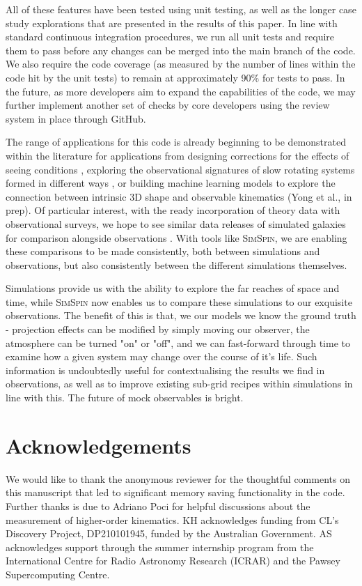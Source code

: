 \documentclass[
  journal=pasa,
  manuscript=research-paper, %
  year=2020,
  volume=37,
]{cup-journal}
\newcommand{\simspin}[1]{\textsc{SimSpin}#1} %
\begin{document}
All of these features have been tested using unit testing, as well as the longer case study explorations that are presented in the results of this paper. 
In line with standard continuous integration procedures, we run all unit tests and require them to pass before any changes can be merged into the main branch of the code. 
We also require the code coverage (as measured by the number of lines within the code hit by the unit tests) to remain at approximately 90\% for tests to pass. 
In the future, as more developers aim to expand the capabilities of the code, we may further implement another set of checks by core developers using the review system in place through GitHub. 

The range of applications for this code is already beginning to be demonstrated within the literature for applications from designing corrections for the effects of seeing conditions \citep{Harborne2020RecoveringData}, exploring the observational signatures of slow rotating systems formed in different ways \citep{Lagos2022Thesimulations}, or building machine learning models to explore the connection between intrinsic 3D shape and observable kinematics (Yong et al., in prep). 
Of particular interest, with the ready incorporation of theory data with observational surveys, we hope to see similar data releases of simulated galaxies for comparison alongside observations  \citep[such as is being prepared for the MAGPI survey as described in][]{Foster2021MAGPIOverview}. 
With tools like \simspin, we are enabling these comparisons to be made consistently, both between simulations and observations, but also consistently between the different simulations themselves. 

Simulations provide us with the ability to explore the far reaches of space and time, while \simspin{} now enables us to compare these simulations to our exquisite observations. 
The benefit of this is that, we our models we know the ground truth - projection effects can be modified by simply moving our observer, the atmosphere can be turned "on" or "off", and we can fast-forward through time to examine how a given system may change over the course of it's life. 
Such information is undoubtedly useful for contextualising the results we find in observations, as well as to improve existing sub-grid recipes within simulations in line with this. 
The future of mock observables is bright. 

\section*{Acknowledgements}
We would like to thank the anonymous reviewer for the thoughtful comments on this manuscript that led to significant memory saving functionality in the code. Further thanks is due to Adriano Poci for helpful discussions about the measurement of higher-order kinematics. KH acknowledges funding from CL's Discovery Project, DP210101945, funded by the Australian Government. AS acknowledges support through the summer internship program from the International Centre for Radio Astronomy Research (ICRAR) and the Pawsey Supercomputing Centre. 
\end{document}
